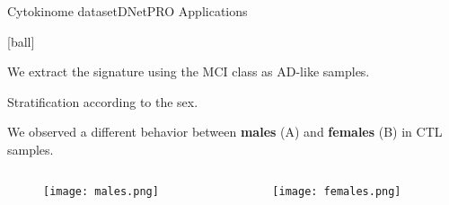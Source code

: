 \documentclass{standalone}
\begin{document}
\begin{frame}{Cytokinome dataset}{DNetPRO Applications}

  [ball]

  \scriptsize{We extract the signature using the MCI class as AD-like samples.}

  \scriptsize{Stratification according to the sex.}

  \scriptsize{We observed a different behavior between \textbf{males} (A) and \textbf{females} (B) in CTL samples.}

  \begin{columns}

    \begin{column}{0.5\linewidth}
      \begin{figure}
        \centering
        \texttt{[image: males.png]}
      \end{figure}
    \end{column}

    \begin{column}{0.5\linewidth}
      \begin{figure}
        \centering
        \texttt{[image: females.png]}
      \end{figure}
    \end{column}

  \end{columns}

\end{frame}


\end{document}
